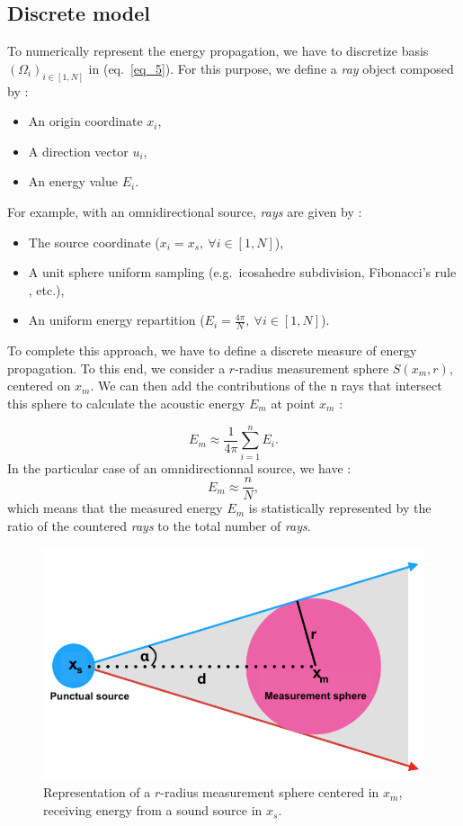 \documentclass[AMA,STIX1COL]{WileyNJD-v2}
\begin{document}
\subsection{Discrete model}

To numerically represent the energy propagation, we have to discretize basis $(\Omega_i)_{i\in[1,N] }$ in (eq.~\ref{eq_5}). For this purpose, we define a \textit{ray} object composed by :
\begin{itemize}
\item An origin coordinate $x_i$,
\item A direction vector $u_i$,
\item An energy value $E_i$.
\end{itemize}

For example, with an omnidirectional source, \textit{rays} are given by :
\begin{itemize}
\item The source coordinate ($x_i = x_s,~\forall i\in[1,N]$),
\item A unit sphere uniform sampling (e.g.~icosahedre subdivision, Fibonacci's rule \cite{fibonacci}, etc.),
\item An uniform energy repartition ($E_i = \frac{4\pi}{N},~\forall i\in[1,N]$).
\end{itemize}

To complete this approach, we have to define a discrete measure of energy propagation. To this end, we consider a $r$-radius measurement sphere $S(x_m, r)$, centered on $x_m$.  We can then add the contributions of the n rays that intersect this sphere to calculate the acoustic energy $E_m$ at point $x_m$ :

\begin{equation}
E_m \approx  \frac{1}{4\pi}  \sum_{i=1}^n E_i.
\end{equation}
In the particular case of an omnidirectionnal source, we have : 
\begin{equation}
E_m \approx  \frac{n}{N},
\end{equation}
which means that the measured energy $E_m$ is statistically represented by the ratio of the countered \textit{rays} to the total number of \textit{rays}.

\begin{figure}[t]
\centering
	\includegraphics[width=0.6\linewidth]{schema_rayon}
	\caption{Representation of a $r$-radius measurement sphere centered in $x_m$, receiving energy from a sound source in $x_s$.}
	\label{schema_rayon}
\end{figure}
\end{document}
